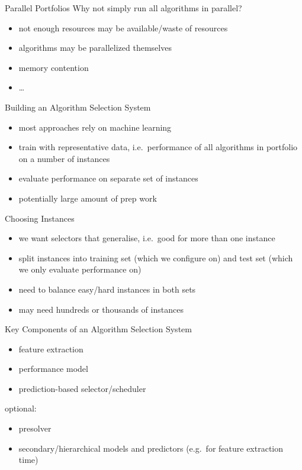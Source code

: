 \begin{frame}{Parallel Portfolios}
Why not simply run all algorithms in parallel?
\begin{itemize}
\item not enough resources may be available/waste of resources
\item algorithms may be parallelized themselves
\item memory contention
\item \ldots
\end{itemize}
\end{frame}

\begin{frame}{Building an Algorithm Selection System}
\begin{itemize}
\item most approaches rely on machine learning
\item train with representative data, i.e.\ performance of all algorithms in
    portfolio on a number of instances
\item evaluate performance on separate set of instances
\item potentially large amount of prep work
\end{itemize}
\end{frame}

\begin{frame}{Choosing Instances}
\begin{itemize}
\item we want selectors that generalise, i.e.\ good for more than one
instance
\item split instances into training set (which we configure on) and test set
(which we only evaluate performance on)
\item need to balance easy/hard instances in both sets
\item may need hundreds or thousands of instances
\end{itemize}
\end{frame}

\begin{frame}{Key Components of an Algorithm Selection System}
\begin{itemize}
\item feature extraction
\item performance model
\item prediction-based selector/scheduler
\end{itemize}
optional:
\begin{itemize}
\item presolver
\item secondary/hierarchical models and predictors (e.g.\ for feature extraction
    time)
\end{itemize}
\end{frame}


